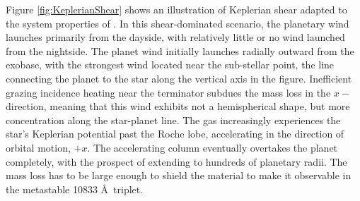 \documentclass[twocolumn]{aastex631}
\newcommand{\hatpb}{\object{HAT-P-67 b}}
\begin{document}
Figure \ref{fig:KeplerianShear} shows an illustration of Keplerian shear adapted to the system properties of \hatpb.  In this shear-dominated scenario, the planetary wind launches primarily from the dayside, with relatively little or no wind launched from the nightside.  The planet wind initially launches radially outward from the exobase, with the strongest wind located near the sub-stellar point, the line connecting the planet to the star along the vertical axis in the figure.  Inefficient grazing incidence heating near the terminator subdues the mass loss in the $x-$direction, meaning that this wind exhibits not a hemispherical shape, but more concentration along the star-planet line.  The gas increasingly experiences the star's Keplerian potential past the Roche lobe, accelerating in the direction of orbital motion, $+x$.  The accelerating column eventually overtakes the planet completely, with the prospect of extending to hundreds of planetary radii.  The mass loss has to be large enough to shield the material to make it observable in the metastable  10833 \AA~triplet.
\end{document}

